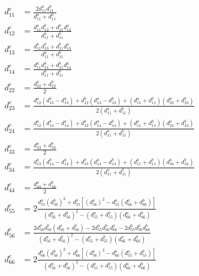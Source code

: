 \documentclass{article}
\begin{document}
\begin{subequations}
\begin{align}
d_{11}^e & = \frac{2d_{11}^a d_{11}^b}{d_{11}^a+d_{11}^b} \\
d_{12}^e & = \frac{d_{11}^a d_{12}^b + d_{11}^b d_{12}^a}{d_{11}^a+d_{11}^b} \\
d_{13}^e & = \frac{d_{11}^a d_{13}^b + d_{11}^b d_{13}^a}{d_{11}^a+d_{11}^b} \\
d_{14}^e & = \frac{d_{11}^a d_{14}^b + d_{11}^b d_{14}^a}{d_{11}^a+d_{11}^b} \\
d_{22}^e & = \frac{d_{22}^a+d_{22}^b}{2}\\
d_{23}^e & = \frac{d_{12}^a(d_{13}^b-d_{13}^a)+d_{12}^b(d_{13}^a-d_{13}^b)+(d_{11}^a+d_{11}^b)(d_{23}^a+d_{23}^b)}{2(d_{11}^a+d_{11}^b)} \\
d_{24}^e & = \frac{d_{12}^a(d_{14}^b-d_{14}^a)+d_{12}^b(d_{14}^a-d_{14}^b)+(d_{11}^a+d_{11}^b)(d_{24}^a+d_{24}^b)}{2(d_{11}^a+d_{11}^b)} \\
d_{33}^e & = \frac{d_{33}^a+d_{33}^b}{2} \\
d_{34}^e & = \frac{d_{13}^a(d_{14}^b-d_{14}^a)+d_{13}^b(d_{14}^a-d_{14}^b)+(d_{11}^a+d_{11}^b)(d_{34}^a+d_{34}^b)}{2(d_{11}^a+d_{11}^b)} \\
d_{44}^e & = \frac{d_{44}^a+d_{44}^b}{2} \\
d_{55}^e & = 2\frac{d_{55}^a (d_{56}^b)^2+d_{55}^b[(d_{56}^a)^2-d_{55}^a(d_{66}^a+d_{66}^b)]}{(d_{56}^a+d_{56}^b)^2-(d_{55}^a+d_{55}^b)(d_{66}^a+d_{66}^b)} \\
d_{56}^e & = \frac{2d_{56}^a d_{56}^b(d_{56}^a+d_{56}^b)-2d_{55}^a d_{56}^b d_{66}^a-2d_{55}^b d_{56}^a d_{66}^b }{(d_{56}^a+d_{56}^b)^2-(d_{55}^a+d_{55}^b)(d_{66}^a+d_{66}^b)} \\
d_{66}^e & = 2\frac{d_{66}^a (d_{56}^b)^2+d_{66}^b[(d_{56}^a)^2-d_{66}^a(d_{55}^a+d_{55}^b)]}{(d_{56}^a+d_{56}^b)^2-(d_{55}^a+d_{55}^b)(d_{66}^a+d_{66}^b)}
\end{align}
\end{subequations}
\end{document}
